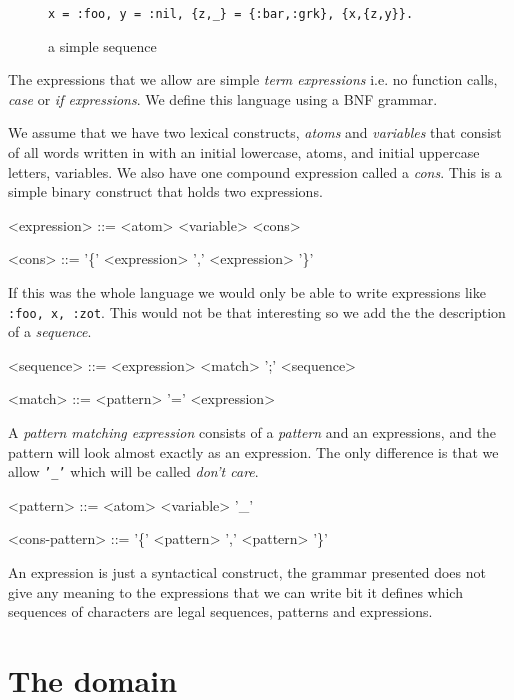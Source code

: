 \documentclass[a4paper,11pt]{article}
\begin{document}
\begin{figure}[ht]
\center
{\tt x = :foo, y = :nil, \{z,_\} = \{:bar,:grk\}, \{x,\{z,y\}\}.}
\caption{a simple sequence}
\label{fig:seq1}
\end{figure}

The expressions that we allow are simple {\em term expressions}
i.e. no function calls, {\em case} or {\em if expressions}. We define
this language using a BNF grammar.

We assume that we have two lexical constructs, {\em atoms} and {\em
  variables} that consist of all words written in with an initial
lowercase, atoms, and initial uppercase letters, variables.  We also
have one compound expression called a {\em cons}. This is a simple
binary construct that holds two expressions.


\begin{grammar}
<expression> ::= <atom> \alt <variable> \alt <cons> 

<cons> ::= '\{' <expression> ',' <expression> '\}'
\end{grammar}



If this was the whole language we would only be able to write
expressions like {\tt {:foo, {x, :zot}}}. This would not be that
interesting so we add the the description of a {\em sequence}.

\begin{grammar}
<sequence> ::= <expression> \alt <match> ';' <sequence>

<match> ::= <pattern> '=' <expression> 
\end{grammar}


A {\em pattern matching expression} consists of a {\em pattern} and an
expressions, and the pattern will look almost exactly as an
expression. The only difference is that we allow {\tt '_'} which will
be called {\em don't care}.

\begin{grammar}
<pattern> ::= <atom>
\alt <variable>
\alt '_'  

<cons-pattern> ::= '\{' <pattern> ',' <pattern> '\}'
\end{grammar}

An expression is just a syntactical construct, the grammar presented
does not give any meaning to the expressions that we can write bit it
defines which sequences of characters are legal sequences, patterns
and expressions.

\section{The domain}
\end{document}
